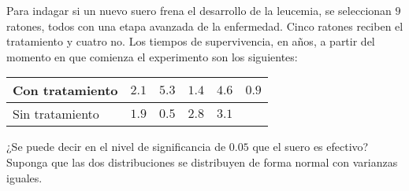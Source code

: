 \begin{enunciado}
 Para indagar si un nuevo suero frena el desarrollo de la leucemia,
 se seleccionan $9$ ratones,
 todos con una etapa avanzada de la enfermedad.
 Cinco ratones reciben el tratamiento y cuatro no.
 Los tiempos de supervivencia, en a\~nos, a partir del momento
 en que comienza el experimento son los siguientes:
 \begin{center}
  \begin{tabular}{l|ccccc}
   Con tratamiento & $2.1$ & $5.3$ & $1.4$ & $4.6$ & $0.9$ \\
   \hline 
   Sin tratamiento & $1.9$ & $0.5$ & $2.8$ & $3.1$
  \end{tabular}
 \end{center}
 ¿Se puede decir en el nivel de significancia de $0.05$
 que el suero es efectivo?
 Suponga que las dos distribuciones se distribuyen de forma normal
 con varianzas iguales.
\end{enunciado}

